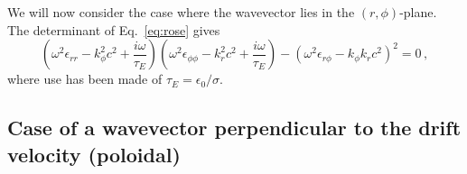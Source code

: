 \documentclass[aps,showpacs,superscriptaddress]{revtex4}
\begin{document}
We will now consider the case where the wavevector lies in the $(r,\phi)$-plane. 
The determinant of Eq.~\eqref{eq:rose} gives
\begin{equation}\label{eq:dispe0}
\left(\omega^2 \epsilon_{rr} - k_\phi^2c^2 +\frac{i\omega}{\tau_E}\right)
\left(\omega^2 \epsilon_{\phi\phi} - k_r^2c^2 +\frac{i\omega}{\tau_E}\right)
-\left(\omega^2 \epsilon_{r\phi} - k_\phi k_rc^2\right)^2 = 0 \, ,
\end{equation}
where use has been made of $\tau_E = \epsilon_0/\sigma$.

\subsection{Case of a wavevector perpendicular to the drift velocity (poloidal)}
\end{document}

